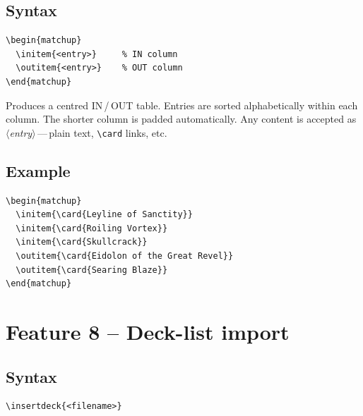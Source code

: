 \documentclass[a4paper,11pt]{article}
\newcommand{\cmd}[1]{\texttt{\textbackslash#1}}
\newcommand{\meta}[1]{\textnormal{\textit{$\langle$#1$\rangle$}}}
\begin{document}
\subsection{Syntax}

\begin{lstlisting}
\begin{matchup}
  \initem{<entry>}     % IN column
  \outitem{<entry>}    % OUT column
\end{matchup}
\end{lstlisting}

Produces a centred IN\,/\,OUT table.  Entries are sorted
alphabetically within each column.  The shorter column is
padded automatically.  Any content is accepted as
\meta{entry}\,---\,plain text, \cmd{card} links, etc.

\subsection{Example}

\begin{lstlisting}
\begin{matchup}
  \initem{\card{Leyline of Sanctity}}
  \initem{\card{Roiling Vortex}}
  \initem{\card{Skullcrack}}
  \outitem{\card{Eidolon of the Great Revel}}
  \outitem{\card{Searing Blaze}}
\end{matchup}
\end{lstlisting}
\begin{result}
\begin{matchup}
\end{matchup}
\end{result}

\section{Feature 8 -- Deck-list import}

\subsection{Syntax}

\begin{lstlisting}
\insertdeck{<filename>}
\end{lstlisting}
\end{document}
